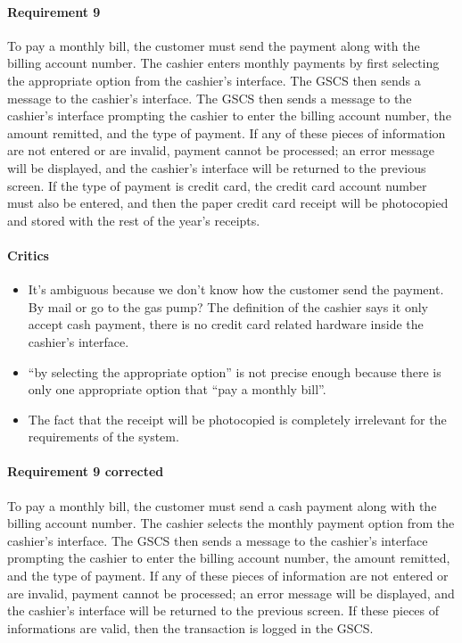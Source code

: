 \paragraph{Requirement 9} To pay a monthly bill, the customer must send
the payment along with the billing account number. The cashier enters
monthly payments by first selecting the appropriate option from the
cashier's interface. The GSCS then sends a message to the cashier's
interface. The GSCS then sends a message to the cashier's interface
prompting the cashier to enter the billing account number, the amount
remitted, and the type of payment. If any of these pieces of information
are not entered or are invalid, payment cannot be processed; an error
message will be displayed, and the cashier's interface will be returned
to the previous screen. If the type of payment is credit card, the credit
card account number must also be entered, and then the paper credit card
receipt will be photocopied and stored with the rest of the year's receipts.

\begin{framed}
    \paragraph{Critics}
    \begin{itemize}
        \item It's ambiguous because we don't know how the customer send
            the payment. By mail or go to the gas pump? The definition of the
            cashier says it only accept cash payment, there is no credit card
            related hardware inside the cashier's interface.

        \item \enquote{by selecting the appropriate option} is not precise
            enough because there is only one appropriate option that
            \enquote{pay a monthly bill}.

        \item The fact that the receipt will be photocopied is
            completely irrelevant for the requirements of the system.
    \end{itemize}

    \paragraph{Requirement 9 corrected} To pay a monthly bill, the customer must send
    a cash payment along with the billing account number. The cashier selects
    the monthly payment option from the
    cashier's interface. The GSCS then sends a message to the cashier's interface
    prompting the cashier to enter the billing account number, the amount
    remitted, and the type of payment. If any of these pieces of information
    are not entered or are invalid, payment cannot be processed; an error
    message will be displayed, and the cashier's interface will be returned
    to the previous screen. If these pieces of informations are valid, then the
    transaction is logged in the GSCS.\@
\end{framed}

